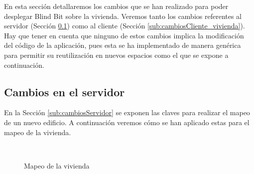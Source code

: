 En esta sección detallaremos los cambios que se han realizado para poder desplegar Blind Bit sobre la vivienda. Veremos tanto los cambios referentes al servidor (Sección \ref{sub:cambiosServidor_vivienda}) como al cliente (Sección \ref{sub:cambiosCliente_vivienda}). Hay que tener en cuenta que ninguno de estos cambios implica la modificación del código de la aplicación, pues esta se ha implementado de manera genérica para permitir su reutilización en nuevos espacios como el que se expone a continuación.

\subsection{Cambios en el servidor}
\label{sub:cambiosServidor_vivienda}

En la Sección \ref{sub:cambiosServidor} se exponen las claves para realizar el mapeo de un nuevo edificio. A continuación veremos cómo se han aplicado estas para el mapeo de la vivienda.


	
\begin{figure}[t!]
	\centering
	
	
	\\
	
	\caption{Mapeo de la vivienda}
	\label{fig:mapeoCasa}
\end{figure}

